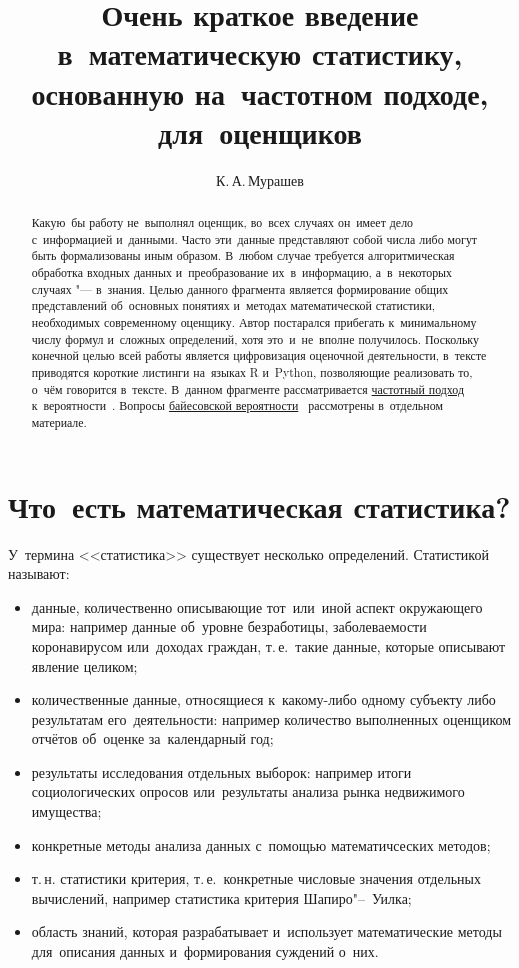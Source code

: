 \documentclass[]{scrartcl}
\title{Очень краткое введение в~математическую статистику, основанную на~частотном подходе, для~оценщиков}
\author{К.\,А.\,Мурашев}
\begin{document}
\maketitle

\begin{abstract}
	Какую~бы работу не~выполнял оценщик, во~всех случаях он~имеет дело с~информацией и~данными. Часто эти~данные представляют собой числа либо могут быть формализованы иным образом. В~любом случае требуется алгоритмическая обработка входных данных и~преобразование их~в~информацию, а~в~некоторых случаях "--- в~знания. Целью данного фрагмента является формирование общих представлений об~основных понятиях и~методах математической статистики, необходимых современному оценщику. Автор постарался прибегать к~минимальному числу формул и~сложных определений, хотя это~и~не~вполне получилось. Поскольку конечной целью всей работы является цифровизация оценочной деятельности, в~тексте приводятся короткие листинги на~языках R и~Python, позволяющие реализовать то, о~чём говорится в~тексте. В~данном фрагменте рассматривается \href{https://ru.wikipedia.org/wiki/Частотная_вероятность}{частотный подход} к~вероятности~\cite{Wiki:Freq-probability}. Вопросы  \href{https://ru.wikipedia.org/wiki/Байесовская_вероятность}{байесовской вероятности}~\cite{Wiki:Bayes-prob} рассмотрены в~отдельном материале.
\end{abstract}

\section{Что~есть математическая статистика?}
У~термина <<статистика>> существует несколько определений. Статистикой называют:
	\begin{itemize}
		\item данные, количественно описывающие тот~или~иной аспект окружающего мира: например данные об~уровне безработицы, заболеваемости коронавирусом или~доходах граждан, т.\,е.~такие данные, которые описывают явление целиком;
		\item количественные данные, относящиеся к~какому-либо одному субъекту либо результатам его~деятельности: например количество выполненных оценщиком отчётов об~оценке за~календарный год;
		\item результаты исследования отдельных выборок: например итоги социологических опросов или~результаты анализа рынка недвижимого имущества;
		\item конкретные методы анализа данных с~помощью математичсеских методов;
		\item т.\,н. статистики критерия, т.\,е.~конкретные числовые значения отдельных вычислений, например статистика критерия Шапиро"--~Уилка;
		\item область знаний, которая разрабатывает и~использует математические методы для~описания данных и~формирования суждений о~них.		   
	\end{itemize}
\end{document}
